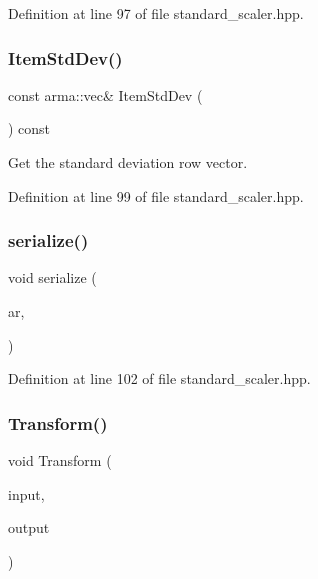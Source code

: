 Definition at line 97 of file standard\+\_\+scaler.\+hpp.

\mbox{\label{classmlpack_1_1data_1_1StandardScaler_ae87a954fbaec076dbe0ca5c0f286ba09}} 
\subsubsection{Item\+Std\+Dev()}
{\footnotesize\ttfamily const arma\+::vec\& Item\+Std\+Dev (\begin{DoxyParamCaption}{ }\end{DoxyParamCaption}) const\hspace{0.3cm}{\ttfamily [inline]}}



Get the standard deviation row vector. 



Definition at line 99 of file standard\+\_\+scaler.\+hpp.

\mbox{\label{classmlpack_1_1data_1_1StandardScaler_a65cba07328997659bec80b9879b15a51}} 
\subsubsection{serialize()}
{\footnotesize\ttfamily void serialize (\begin{DoxyParamCaption}\item[{Archive \&}]{ar,  }\item[{const uint32\+\_\+t}]{ }\end{DoxyParamCaption})\hspace{0.3cm}{\ttfamily [inline]}}



Definition at line 102 of file standard\+\_\+scaler.\+hpp.

\mbox{\label{classmlpack_1_1data_1_1StandardScaler_a7bc470a1e097f5b0aaf2396691432b3f}} 
\subsubsection{Transform()}
{\footnotesize\ttfamily void Transform (\begin{DoxyParamCaption}\item[{const Mat\+Type \&}]{input,  }\item[{Mat\+Type \&}]{output }\end{DoxyParamCaption})\hspace{0.3cm}{\ttfamily [inline]}}



